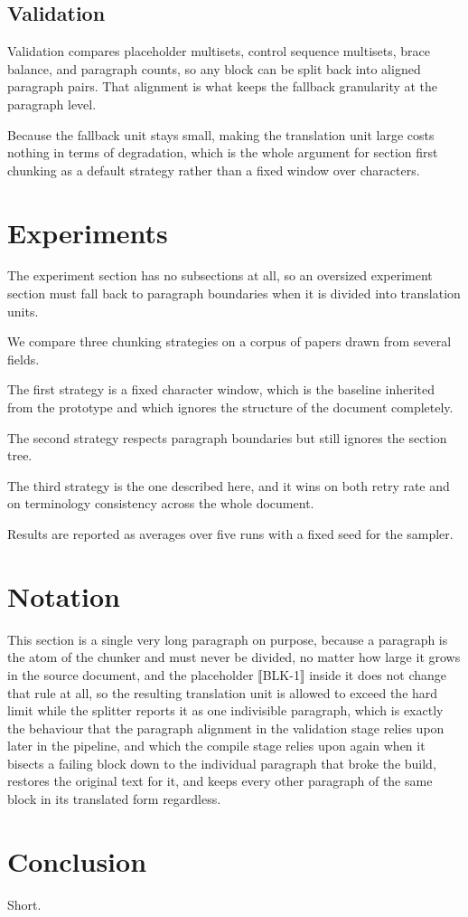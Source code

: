 \subsection{Validation}
Validation compares placeholder multisets, control sequence multisets, brace balance,
and paragraph counts, so any block can be split back into aligned paragraph pairs.
That alignment is what keeps the fallback granularity at the paragraph level.

Because the fallback unit stays small, making the translation unit large costs nothing
in terms of degradation, which is the whole argument for section first chunking as a
default strategy rather than a fixed window over characters.

\section{Experiments}
The experiment section has no subsections at all, so an oversized experiment section
must fall back to paragraph boundaries when it is divided into translation units.

We compare three chunking strategies on a corpus of papers drawn from several fields.

The first strategy is a fixed character window, which is the baseline inherited from
the prototype and which ignores the structure of the document completely.

The second strategy respects paragraph boundaries but still ignores the section tree.

The third strategy is the one described here, and it wins on both retry rate and on
terminology consistency across the whole document.

Results are reported as averages over five runs with a fixed seed for the sampler.

\section{Notation}
This section is a single very long paragraph on purpose, because a paragraph is the
atom of the chunker and must never be divided, no matter how large it grows in the
source document, and the placeholder ⟦BLK-1⟧ inside it does not change that rule at
all, so the resulting translation unit is allowed to exceed the hard limit while the
splitter reports it as one indivisible paragraph, which is exactly the behaviour that
the paragraph alignment in the validation stage relies upon later in the pipeline,
and which the compile stage relies upon again when it bisects a failing block down to
the individual paragraph that broke the build, restores the original text for it, and
keeps every other paragraph of the same block in its translated form regardless.

\section{Conclusion}
Short.
